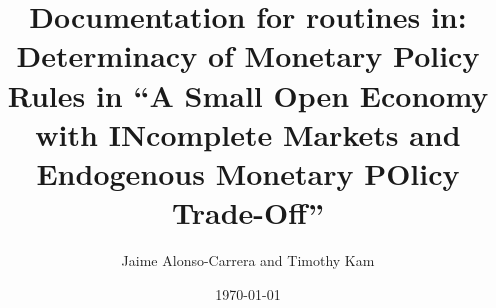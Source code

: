 \documentclass[12pt]{amsart}
\title{Documentation for \textttt{MATLAB} routines in: \\
	Determinacy of Monetary Policy Rules in ``A Small Open Economy with INcomplete Markets and Endogenous Monetary POlicy Trade-Off'' }
\author{Jaime Alonso-Carrera and Timothy Kam}
\date{\today} %
\begin{document}
\maketitle
\tableofcontents

\section{}
\subsection{}
\end{document}
